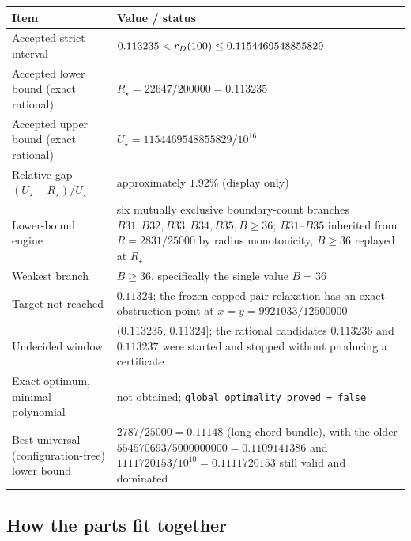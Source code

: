 \begin{center}
\footnotesize
\begin{tabular}{@{}>{\raggedright\arraybackslash}p{}>{\raggedright\arraybackslash}p{}@{}}
\toprule
Item & Value / status \\
\midrule
Accepted strict interval &
$0.113235<r_{D}(100)\le 0.1154469548855829$ \\[1mm]
Accepted lower bound (exact rational) &
$R_\star=22647/200000=0.113235$ \\[1mm]
Accepted upper bound (exact rational) &
$U_\star=1154469548855829/10^{16}$ \\[1mm]
Relative gap $(U_\star-R_\star)/U_\star$ &
approximately $1.92\%$ (display only) \\[1mm]
Lower-bound engine &
six mutually exclusive boundary-count branches
$B31,B32,B33,B34,B35,B{\ge}36$; $B31$--$B35$ inherited from $R=2831/25000$ by radius
monotonicity, $B{\ge}36$ replayed at $R_\star$ \\[1mm]
Weakest branch &
$B\ge 36$, specifically the single value $B=36$ \\[1mm]
Target not reached &
$0.11324$; the frozen capped-pair relaxation has an exact obstruction point at
$x=y=9921033/12500000$ \\[1mm]
Undecided window &
$(0.113235,\,0.11324]$; the rational candidates $0.113236$ and $0.113237$ were started and
stopped without producing a certificate \\[1mm]
Exact optimum, minimal polynomial &
not obtained; \texttt{global\_\allowbreak{}optimality\_\allowbreak{}proved = false} \\[1mm]
Best universal (configuration-free) lower bound &
$2787/25000=0.11148$ (long-chord bundle), with the older
$554570693/5000000000=0.1109141386$ and
$1111720153/10^{10}=0.1111720153$ still valid and dominated \\
\bottomrule
\end{tabular}
\end{center}

\subsection*{How the parts fit together}


